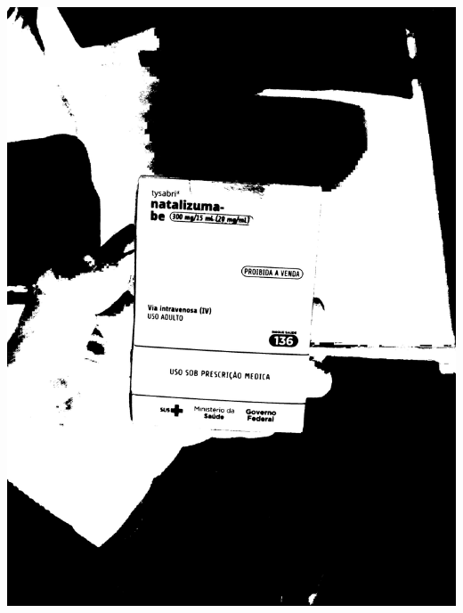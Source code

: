 \begin{frame}
\begin{columns}
\begin{column}{0.24\textwidth}
			\includegraphics[height=0.35\textheight]{../pictures/tysabri_cmyk_y_only_thresh.jpg}
			\\\vspace{\floatsep}

\end{column}
\end{columns}
\end{frame}
